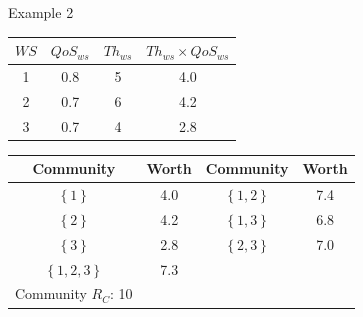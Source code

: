 \documentclass{beamer}
\begin{document}
\begin{frame}{Example 2}
    \begin{table}[!t]
    \renewcommand{\arraystretch}{1.3}
    \label{example_2}
    \centering
    \begin{tabular}{c c c c}
    \hline
    $WS$ & $QoS_{ws}$ & $Th_{ws}$ & $Th_{ws} \times QoS_{ws}$\\
    \hline
    1 & 0.8 & 5 & 4.0\\
    2 & 0.7 & 6 & 4.2\\
    3 & 0.7 & 4 & 2.8\\
    \hline
    \end{tabular}
    \end{table}

    \begin{table}[!t]
    \renewcommand{\arraystretch}{1.3}
    \label{example_2_2}
    \centering
    \begin{tabular}{c c || c c}
    \hline
    Community & Worth & Community & Worth\\
    \hline
    $\left\{1\right\}$ & 4.0 & $\left\{1,2\right\}$ & 7.4\\
    $\left\{2\right\}$ & 4.2 & $\left\{1,3\right\}$ & 6.8\\
    $\left\{3\right\}$ & 2.8 & $\left\{2,3\right\}$ & 7.0\\
    $\left\{1,2,3\right\}$ & 7.3\\
    \hline
    Community $R_C$: 10\\
    \hline
    \end{tabular}
    \end{table}
\end{frame}
\end{document}
